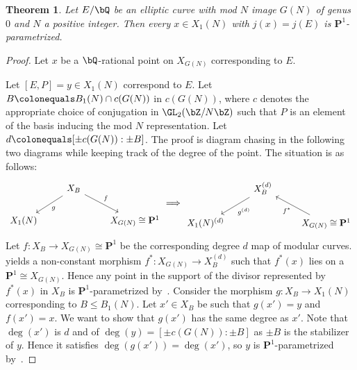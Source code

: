 \documentclass[11pt,reqno]{amsart}
\theoremstyle{plain}
\newtheorem{theorem}{Theorem}%
\theoremstyle{definition}
\newcommand{\Q}{\bQ}
\newcommand{\Z}{\bZ}
\newcommand{\PP}{\mathbf P}
\newcommand{\isom}{\cong}
\newcommand{\filip}[1]{{\textcolor{cyan}{Filip: [#1]}}}
\newcommand{\abbey}[1]{\textcolor{blue}{Abbey: #1}}
\begin{document}
\begin{theorem} \label{Genus0Prop}
Let $E/\Q$ be an elliptic curve with mod $N$ image $G(N)$ of genus $0$ and $N$ a positive integer. %
Then every $x \in X_1(N)$ with $j(x) = j(E)$ is $\PP^1$-parametrized.
\end{theorem}
\begin{proof}
Let $x$ be a $\Q$-rational point on $X_{G(N)}$ corresponding to $E$.

Let $[E,P] = y \in X_1(N)$ correspond to $E$. Let $B \colonequals B_1(N) \cap c(G(N))$ in $c(G(N))$, where $c$ denotes the appropriate choice of conjugation in $\GL_2(\Z/N\Z)$ such that $P$ is an element of the basis inducing the mod $N$ representation. Let $d \colonequals [\pm c(G(N)) : \pm B]$. The proof is diagram chasing in the following two diagrams while keeping track of the degree of the point.  The situation is as follows:
\[
\begin{tikzcd}
     &X_B \arrow[rd, "f"] \dlar["g"] &  \\
     X_1(N) & &X_{G(N)} \isom \PP^1
\end{tikzcd}
     \Longrightarrow
\begin{tikzcd}
      &X_B^{(d)} \dlar["g^{(d)}"] & \\
     X_1(N)^{(d)} & &X_{G(N)} \isom \PP^1\arrow[ul, "f^*"]
\end{tikzcd}
\]
Let $f\colon X_{B}\rightarrow X_{G(N)} \isom \PP^1$ be the corresponding degree $d$ map of modular curves.
 yields a non-constant morphism $f^*\colon X_{G(N)} \to X_{B}^{(d)}$ such that $f^*(x)$ lies on a $\PP^1 \isom X_{G(N)}$. 
Hence any point in the support of the divisor represented by $f^*(x)$ in $X_B$ is $\PP^1$-parametrized by~. Consider the morphism $g\colon X_B \to X_1(N)$ corresponding to $B \leq B_1(N)$. Let $x'\in X_B$ be such that $g(x')=y$ and $f(x')=x$. We want to show that $g(x')$ has the same degree as $x'$. Note that $\deg(x')$ is $d$ and of $\deg(y)=[\pm c(G(N)): \pm B]$ as $\pm B$ is the stabilizer of $y$. Hence it satisfies $\deg(g(x')) = \deg(x')$, so $y$ is $\PP^1$-parametrized by~.
\end{proof}
\end{document}

